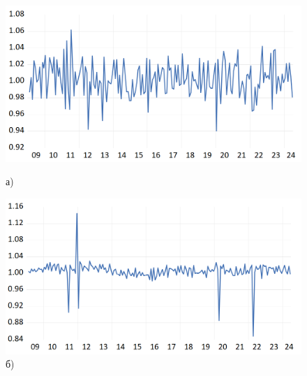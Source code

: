 \documentclass[a4paper, 14pt]{extreport}
\numberwithin{equation}{subsection}
\numberwithin{equation}{section}
\begin{document}
	\begin{figure}
		\centering
		\begin{minipage}{0.5\textwidth}
			\centering
		\includegraphics[scale=0.25]{images/img09}
			\caption*{а)}
		\end{minipage}%
		\begin{minipage}{0.5\textwidth}
			\centering
		\includegraphics[scale=0.25]{images/img10}
			\caption*{б)}
		\end{minipage}%
		

\end{figure}
\end{document}
